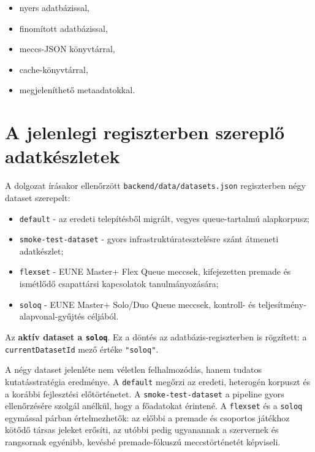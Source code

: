 \begin{itemize}
    \item nyers adatbázissal,
    \item finomított adatbázissal,
    \item meccs-JSON könyvtárral,
    \item cache-könyvtárral,
    \item megjeleníthető metaadatokkal.
\end{itemize}

\section{A jelenlegi regiszterben szereplő adatkészletek}

A dolgozat írásakor ellenőrzött \texttt{backend/data/datasets.json} regiszterben négy dataset szerepelt:

\begin{itemize}
    \item \texttt{default} - az eredeti telepítésből migrált, vegyes queue-tartalmú alapkorpusz;
    \item \texttt{smoke-test-dataset} - gyors infrastruktúratesztelésre szánt átmeneti adatkészlet;
    \item \texttt{flexset} - EUNE Master$+$ Flex Queue meccsek, kifejezetten premade és ismétlődő csapattársi kapcsolatok tanulmányozására;
    \item \texttt{soloq} - EUNE Master$+$ Solo/Duo Queue meccsek, kontroll- és teljesítmény-alapvonal-gyűjtés céljából.
\end{itemize}

Az \textbf{aktív dataset a \texttt{soloq}}. Ez a döntés az adatbázis-regiszterben is rögzített: a \texttt{currentDatasetId} mező értéke \texttt{"soloq"}.

A négy dataset jelenléte nem véletlen felhalmozódás, hanem tudatos kutatásstratégia eredménye. A \texttt{default} megőrzi az eredeti, heterogén korpuszt és a korábbi fejlesztési előtörténetet. A \texttt{smoke-test-dataset} a pipeline gyors ellenőrzésére szolgál anélkül, hogy a főadatokat érintené. A \texttt{flexset} és a \texttt{soloq} egymással párban értelmezhetők: az előbbi a premade és csoportos játékhoz kötődő társas jeleket erősíti, az utóbbi pedig ugyanannak a szervernek és rangsornak egyénibb, kevésbé premade-fókuszú meccstörténetét képviseli.

